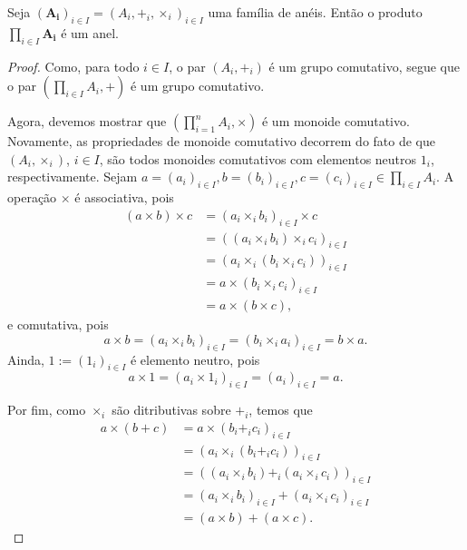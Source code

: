 \begin{proposition}
Seja $(\bm{A_i})_{i \in I}=(A_i,+_i,\times_i)_{i \in I}$ uma família de anéis. Então o produto $\prod_{i \in I}\bm{A_i}$ é um anel.
\end{proposition}
\begin{proof}
Como,  para todo $i \in I$, o par $(A_i,+_i)$ é um grupo comutativo, segue que o par $\left(\prod_{i \in I} A_i,+ \right)$ é um grupo comutativo.

Agora, devemos mostrar que $\left( \prod_{i=1}^n A_i,\times \right)$ é um monoide comutativo. Novamente, as propriedades de monoide comutativo decorrem do fato de que $(A_i,\times_i)$, $i \in I$, são todos monoides comutativos com elementos neutros $1_i$, respectivamente. Sejam $a=(a_i)_{i \in I}, b=(b_i)_{i \in I}, c=(c_i)_{i \in I} \in \prod_{i \in I} A_i$. A operação $\times$ é associativa, pois
	\begin{align*}
	(a \times b) \times c &= (a_i \times_i b_i)_{i \in I} \times c \\
		&= ((a_i \times_i b_i) \times_i c_i)_{i \in I} \\
		&= (a_i \times_i (b_i \times_i c_i))_{i \in I} \\
		&= a \times (b_i \times_i c_i)_{i \in I} \\
		&= a \times (b \times c),
	\end{align*}
e comutativa, pois
	\begin{equation*}
	a \times b = (a_i \times_i b_i)_{i \in I} = (b_i \times_i a_i)_{i \in I} = b \times a.
	\end{equation*}
Ainda, $1 := (1_i)_{i \in I}$ é elemento neutro, pois
	\begin{equation*}
	a \times 1 = (a_i \times 1_i)_{i \in I} = (a_i)_{i \in I} = a.
	\end{equation*}

	Por fim, como $\times_i$ são ditributivas sobre $+_i$, temos que
	\begin{align*}
	a \times (b + c) &= a \times (b_i +_i c_i)_{i \in I} \\
		&= (a_i \times_i (b_i +_i c_i))_{i \in I} \\
		&= ((a_i \times_i b_i) +_i (a_i \times_i c_i))_{i \in I} \\
		&= (a_i \times_i b_i)_{i \in I} + (a_i \times_i c_i)_{i \in I} \\
		&= (a \times b) + (a \times c).
	\end{align*}
\end{proof}




